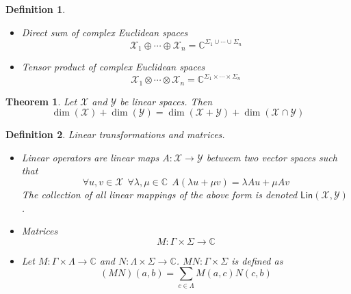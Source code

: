 \documentclass[aps,pra,onecolumn,notitlepage,superscriptaddress]{revtex4-1}
\newcommand{\C}{\mathbb{C}}
\newcommand{\spc}[1]{\mathcal{#1}}
\newcommand{\Lin}{\mathsf{Lin}}
\newtheorem{theo}{Theorem}
\newtheorem{defi}{Definition}
\begin{document}
\begin{defi}
\begin{itemize}
            \item Direct sum of complex Euclidean spaces
            \begin{equation}
                \spc X_1 \oplus \cdots \oplus \spc X_n = \C^{\Sigma_1 \cup \cdots \cup \Sigma_n}
            \end{equation}
    
            \item Tensor product of complex Euclidean spaces
            \begin{equation}
                \spc X_1 \otimes \cdots \otimes \spc X_n = \C^{\Sigma_1 \times \cdots \times \Sigma_n}
            \end{equation}
        \end{itemize}
    \end{defi}

    \begin{theo}
        Let $\spc X$ and $\spc Y$ be linear spaces. Then
        \begin{equation}
            \dim(\spc X) + \dim(\spc Y) = \dim(\spc X+\spc Y) + \dim(\spc X \cap \spc Y)
        \end{equation}
    \end{theo}

    \begin{defi} 
        Linear transformations and matrices.
        \begin{itemize}
            \item Linear operators are linear maps $A: \spc X \to \spc Y$ betweem two vector spaces such that
            \begin{equation}
                \forall u, v \in \spc X \ \ \forall \lambda, \mu \in \C \ \ A(\lambda u + \mu v) = \lambda Au + \mu Av
            \end{equation}
            The collection of all linear mappings of the above form is denoted $\Lin(\spc X,\spc Y)$.
            \item Matrices
            \begin{equation}
                M : \Gamma \times \Sigma \to \C
            \end{equation}
            \item Let $M : \Gamma \times \Lambda \to \C$ and $N : \Lambda \times \Sigma \to \C$. $MN : \Gamma \times \Sigma$ is defined as
            \begin{equation}
                (MN)(a,b) = \sum_{c \in \Lambda} M(a,c)N(c,b)
            \end{equation}
        \end{itemize}
    \end{defi}
\end{document}
